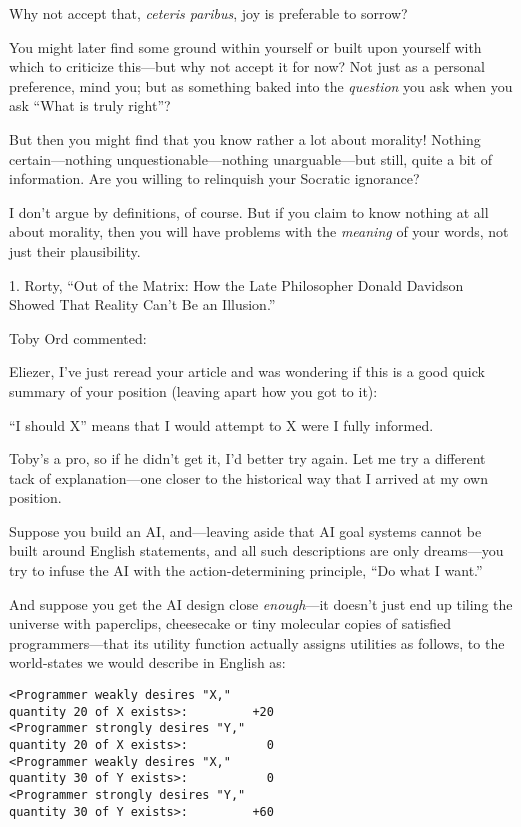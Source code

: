 {
 Why not accept that, \textit{ceteris paribus}, joy is preferable
to sorrow?}

{
 You might later find some ground within yourself or built upon
yourself with which to criticize this---but why not accept it for now?
Not just as a personal preference, mind you; but as something baked
into the \textit{question} you ask when you ask ``What
is truly right''?}

{
 But then you might find that you know rather a lot about morality!
Nothing certain---nothing unquestionable---nothing unarguable---but
still, quite a bit of information. Are you willing to relinquish your
Socratic ignorance?}

{
 I don't argue by definitions, of course. But if
you claim to know nothing at all about morality, then you will have
problems with the \textit{meaning} of your words, not just their
plausibility.}

\myendsectiontext


\bigskip

{
 1. Rorty, ``Out of the Matrix: How the Late
Philosopher Donald Davidson Showed That Reality Can't
Be an Illusion.''}


{
 Toby Ord commented:}

{
 Eliezer, I've just reread your article and was
wondering if this is a good quick summary of your position (leaving
apart how you got to it):}

{
 ``I should X'' means that I
would attempt to X were I fully informed.}

{
 Toby's a pro, so if he didn't get
it, I'd better try again. Let me try a different tack
of explanation---one closer to the historical way that I arrived at my
own position.}

{
 Suppose you build an AI, and---leaving aside that AI goal systems
cannot be built around English statements, and all such descriptions
are only dreams---you try to infuse the AI with the action-determining
principle, ``Do what I want.''}

{
 And suppose you get the AI design close \textit{enough}{}---it
doesn't just end up tiling the universe with
paperclips, cheesecake or tiny molecular copies of satisfied
programmers---that its utility function actually assigns utilities as
follows, to the world-states we would describe in English as:}

\begin{verbatim}
<Programmer weakly desires "X,"
quantity 20 of X exists>:         +20
<Programmer strongly desires "Y,"
quantity 20 of X exists>:           0
<Programmer weakly desires "X,"
quantity 30 of Y exists>:           0
<Programmer strongly desires "Y,"
quantity 30 of Y exists>:         +60
\end{verbatim}



